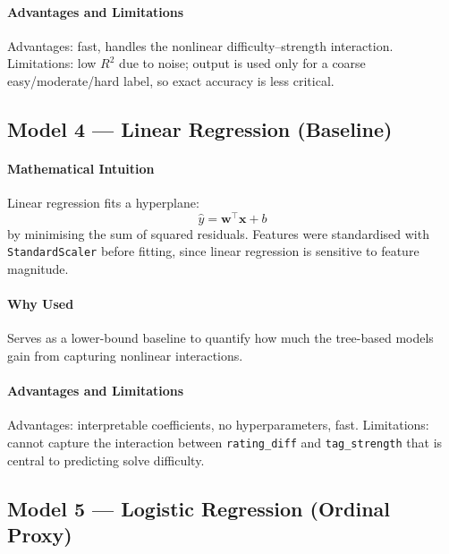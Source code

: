 \documentclass[12pt,a4paper]{article}
\begin{document}
\paragraph{Advantages and Limitations}
Advantages: fast, handles the nonlinear difficulty--strength interaction. \newline
Limitations: low $R^2$ due to noise; output is used only for a coarse
easy/moderate/hard label, so exact accuracy is less critical.

\subsection*{Model 4 --- Linear Regression (Baseline)}

\paragraph{Mathematical Intuition}
Linear regression fits a hyperplane:
\[
    \hat{y} = \mathbf{w}^\top \mathbf{x} + b
\]
by minimising the sum of squared residuals. Features were standardised with
\texttt{StandardScaler} before fitting, since linear regression is sensitive
to feature magnitude.

\paragraph{Why Used}
Serves as a lower-bound baseline to quantify how much the tree-based models gain
from capturing nonlinear interactions.

\paragraph{Advantages and Limitations}
Advantages: interpretable coefficients, no hyperparameters, fast. \newline
Limitations: cannot capture the interaction between \texttt{rating\_diff} and
\texttt{tag\_strength} that is central to predicting solve difficulty.

\subsection*{Model 5 --- Logistic Regression (Ordinal Proxy)}
\end{document}
